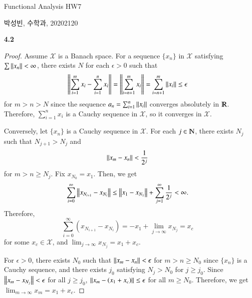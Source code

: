 \documentclass[a4paper, 12pt]{article}
\theoremstyle{Mydefinition}
\theoremstyle{Mytheorem}
\begin{document}
\thispagestyle{myfirstpage}
\begin{center}
	\Large{Functional Analysis HW7}
\end{center}
박성빈, 수학과, 20202120

\noindent \textbf{4.2}
\begin{proof}
Assume $\mathscr{X}$ is a Banach space. For a sequence $\{x_n\}$ in $\mathscr{X}$ satisfying $\sum\norm{x_n}<\infty$, there exists $N$ for each $\epsilon>0$ such that
\begin{equation}
    \norm{\sum_{i=1}^m x_i - \sum_{i=1}^n x_i} = \norm{\sum_{i=n+1}^m x_i}= \sum_{i=n+1}^m \norm{x_i}\leq \epsilon
\end{equation}
for $m>n>N$ since the sequence $a_n = \sum_{i=1}^n \norm{x_i}$ converges absolutely in $\varmathbb{R}$. Therefore, $\sum_{i=1}^n x_i$ is a Cauchy sequence in $\mathscr{X}$, so it converges in $\mathscr{X}$.

Conversely, let $\{x_n\}$ is a Cauchy sequence in $\mathscr{X}$. For each $j\in\varmathbb{N}$, there exists $N_j$ such that $N_{j+1}>N_j$ and
\begin{equation}
    \norm{x_m-x_n}<\frac{1}{2^j}
\end{equation}
for $m>n\geq N_j$. Fix $x_{N_0} = x_1$. Then, we get
\begin{equation}
    \sum_{i=0}^\infty \norm{x_{N_{i+1}}-x_{N_i}} \leq \norm{x_1-x_{N_1}}+\sum_{j=1}^\infty \frac{1}{2^j} <\infty.
\end{equation}
Therefore,
\begin{equation}
    \sum_{i=0}^\infty (x_{N_{i+1}}-x_{N_i}) = -x_1 + \lim_{j\rightarrow \infty} x_{N_j} = x_c
\end{equation}
for some $x_c\in \mathscr{X}$, and $\lim_{j\rightarrow \infty} x_{N_j} = x_1+x_c$. 

For $\epsilon>0$, there exists $N_0$ such that $\norm{x_m-x_n}<\epsilon$ for $m>n\geq N_0$ since $\{x_n\}$ is a Cauchy sequence, and there exists $j_0$ satisfying $N_{j}>N_0$ for $j\geq j_0$. Since $\norm{x_m-x_{N_j}} < \epsilon$ for all $j\geq j_0$, $\norm{x_m-(x_1+x_c)}\leq\epsilon$ for all $m\geq N_0$. Therefore, we get $\lim_{m\rightarrow \infty} x_m = x_1+x_c$.
\end{proof}
\end{document}
